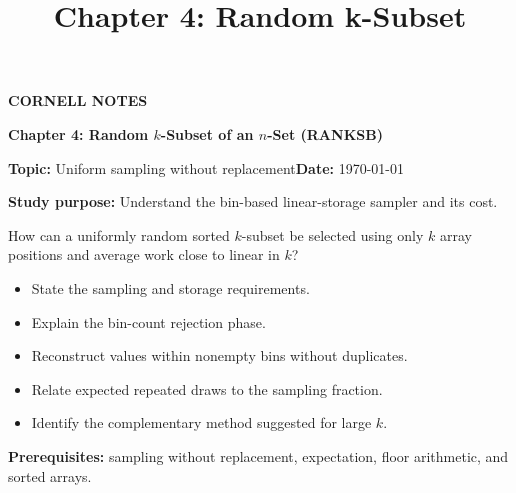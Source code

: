 \documentclass[10pt,letterpaper]{article}
\title{Chapter 4: Random k-Subset}
\author{}
\date{}
\begin{document}
\maketitle
\begin{tcolorbox}[colback=Paper,colframe=Ink]{\small\bfseries\color{Teal}CORNELL NOTES}\par{\LARGE\bfseries Chapter 4: Random $k$-Subset of an $n$-Set (RANKSB)}\par\medskip\textbf{Topic:} Uniform sampling without replacement\hfill\textbf{Date:} \today\par\textbf{Study purpose:} Understand the bin-based linear-storage sampler and its cost.\end{tcolorbox}
\begin{tcolorbox}[colback=Teal!5,colframe=Teal,title=Essential question]How can a uniformly random sorted $k$-subset be selected using only $k$ array positions and average work close to linear in $k$?\end{tcolorbox}
\begin{tcolorbox}[colback=white,colframe=Mist,title=Learning objectives]\begin{itemize}\item State the sampling and storage requirements.\item Explain the bin-count rejection phase.\item Reconstruct values within nonempty bins without duplicates.\item Relate expected repeated draws to the sampling fraction.\item Identify the complementary method suggested for large $k$.\end{itemize}\textbf{Prerequisites:} sampling without replacement, expectation, floor arithmetic, and sorted arrays.\end{tcolorbox}
\end{document}
